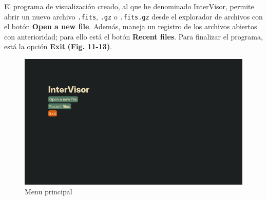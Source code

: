\documentclass[9pt,twocolumn,a4paper]{opticajnl}
\begin{document}
El programa de visualización creado, al que he denominado InterVisor, permite abrir un nuevo archivo \verb|.fits|, \verb|.gz| o \verb|.fits.gz| desde el explorador de archivos con el botón \textbf{Open a new file}. Además, maneja un registro de los archivos abiertos con anterioridad; para ello está el botón \textbf{Recent files}. Para finalizar el programa, está la opción \textbf{Exit} \textbf{(Fig. 11-13)}.

\begin{figure}
    \centering
    \includegraphics[width=1\linewidth]{menuprincipal1.png}
    \caption{Menu principal}
    \label{fig:menuprincipal1}
\end{figure}
\end{document}
